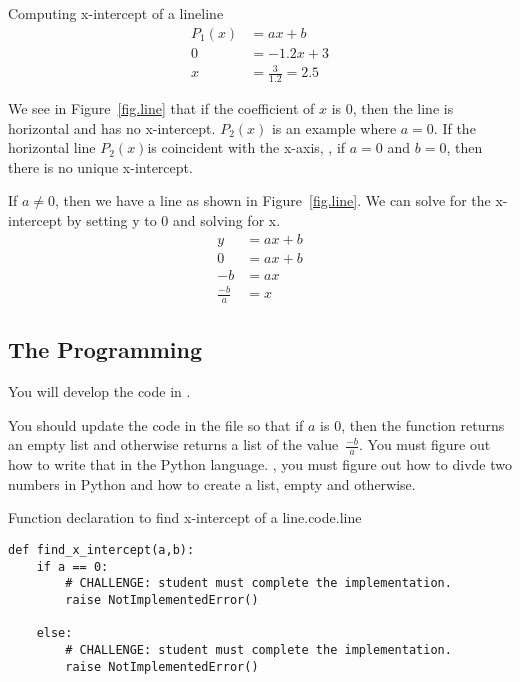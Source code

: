 \begin{example}{Computing x-intercept of a line}{line}
  \begin{align*}
  P_1(x) &= a x + b \\
  0  &= -1.2 x + 3\\
  x &= \frac{3}{1.2} = 2.5
  \end{align*}
\end{example}

We see in Figure~\ref{fig.line} that if the coefficient of $x$ is 0, then the
line is horizontal and has no x-intercept. $P_2(x)$ is an example where $a=0$.
If the horizontal line $P_2(x)$is coincident
with the x-axis, \ie, if $a=0$ and $b=0$, then there is no unique x-intercept.





If $a\neq 0$,  then we have a line as shown in Figure~\ref{fig.line}.  We can
solve for the x-intercept by setting y to 0 and solving for x.
\begin{align*}
  y &= a x + b\\
  0 &= a x + b\\
  -b &= a x\\
  \frac{-b}{a} &= x
\end{align*}



\subsection{The Programming}

You will develop the code in .

You should update the code in the file  so that if
$a$ is 0, then the function returns an empty list and otherwise
returns a list of the value~$\frac{-b}{a}$.  You must figure out how
to write that in the Python language.  \Ie, you must figure out how to
divde two numbers in Python and how to create a list, empty and
otherwise.


\begin{listing}{Function declaration to find x-intercept of a line.}{code.line}
\begin{minipage}[c]{0.95\textwidth}\begin{lstlisting}
def find_x_intercept(a,b):
    if a == 0:
        # CHALLENGE: student must complete the implementation.
        raise NotImplementedError()

    else:
        # CHALLENGE: student must complete the implementation.
        raise NotImplementedError()
\end{lstlisting}\end{minipage}\end{listing}


